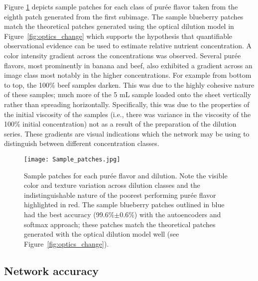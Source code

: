 \documentclass[authoryear]{elsarticle}
\begin{document}
Figure \ref{fig:sample_patches} depicts sample patches for each class of pur\' ee flavor taken from the eighth patch generated from the first subimage. The sample blueberry patches match the theoretical patches generated using the optical dilution model in Figure~\ref{fig:optics_change} which supports the hypothesis that quantifiable observational evidence can be used to estimate relative nutrient concentration. A color intensity gradient across the concentrations was observed. Several pur\' ee flavors, most prominently in banana and beef, also exhibited a gradient across an image class most notably in the higher concentrations. For example from bottom to top, the 100\% beef samples darken. This was due to the highly cohesive nature of these samples; much more of the 5 mL sample loaded onto the sheet vertically rather than spreading horizontally. Specifically, this was due to the properties of the initial viscosity of the samples (i.e., there was variance in the viscosity of the 100\% initial concentration) not as a result of the preparation of the dilution series. These gradients are visual indications which the network may be using to distinguish between different concentration classes.

\begin{figure}
\centering
\texttt{[image: Sample\_patches.jpg]}
\caption{Sample patches for each pur\' ee flavor and dilution. Note the visible color and texture variation across dilution classes and the indistinguishable nature of the poorest performing pur\' ee flavor highlighted in red. The sample blueberry patches outlined in blue had the best accuracy (99.6\%$\pm$0.6\%) with the autoencoders and softmax approach; these patches match the theoretical patches generated with the optical dilution model well (see Figure~\ref{fig:optics_change}).}
\label{fig:sample_patches}
\end{figure}\subsection{Network accuracy}\label{ssec:network accuracty}
\end{document}
